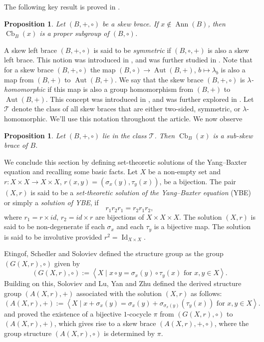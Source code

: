 \documentclass[10pt,a4paper]{amsart}
\numberwithin{equation}{section}
\newtheorem{pro}[equation]{Proposition}
\newcommand{\Cb}{\operatorname{Cb} }
\newcommand{\Id}{\operatorname{Id}}
\newcommand{\gen}[1]{\left < #1 \right >}
\newcommand{\Aut}{\operatorname{Aut} }
\newcommand{\Ann}{\operatorname{Ann} }
\begin{document}
 The following key result is proved in \cite[Theorem 3.3]{CFT25}.

\begin{pro} %
   Let $(B, +, \circ)$ be a skew brace.    If $x \notin \Ann(B)$, then $\Cb_{B}(x)$ is a proper subgroup of  $(B, \circ)$.
\end{pro}



A skew left brace $(B, +, \circ)$ is said to be \emph{symmetric} if $(B, \circ, +)$ is also a skew left brace. This notion was introduced in \cite{LC19}, and was further studied in \cite{BNY23, AC20}. Note that for a skew brace $(B, +, \circ)$ the map $(B, \circ) \to \Aut(B, +)$, $b \mapsto \lambda_b$ is also a map from $(B, +)$ to $\Aut(B, +)$.  We say that the skew brace $(B, +, \circ)$ is \emph{$\lambda$-homomorphic} if this map is also a group homomorphism from $(B, +)$ to $\Aut(B, +)$.  This concept was introduced in \cite{CCD20}, and was further explored in \cite{BNY22}. Let $\mathcal{T}$ denote the class of all skew braces that are either two-sided, symmetric, or $\lambda$-homomorphic.  We'll use this notation throughout the article.  We now observe

\begin{pro}\label{TS-S-L}
    Let $(B, +, \circ)$ lie in the class $\mathcal{T}$.  Then $\Cb_{B}(x)$ is a sub-skew brace of $B$.
\end{pro}


We conclude this section by defining set-theoretic solutions of the Yang--Baxter equation and recalling some basic facts.
Let $X$ be a non-empty set and $r : X \times X \to X \times X$, 
$r(x, y) = (\sigma_x(y), \tau_y(x))$, be a bijection. The pair $(X, r)$ is said to be a {\it set-theoretic solution of the Yang--Baxter equation} (YBE) or simply a {\it solution of YBE}, if
$$
r_1 r_2 r_1 = r_2 r_1 r_2,
$$
where $r_1 = r \times id$, $r_2 = id \times r$ are bijections of $X \times X \times X$. 
The solution $(X,r)$ is said to be non-degenerate if each $\sigma_x$ and each $\tau_y$ is a bijective map. The solution is said to be involutive provided $r^2 = \Id_{X \times X}$.

Etingof, Schedler and Soloviev \cite{ESS99} defined  the structure group as the group $(G(X, r), \circ)$  given by 
$$(G(X,r), \circ) := \gen{X \mid x \circ y = \sigma_x(y) \circ \tau_y(x) \mbox{ for } x, y \in X}.$$
Building on this, Soloviev \cite{S2000} and Lu, Yan and Zhu \cite{LYZ20} defined the derived structure group $(A(X,r),+)$ associated with the solution $(X,r)$ as follows:
$$(A(X,r), +) := \gen{X \mid x + \sigma_x(y) = \sigma_x(y) + \sigma_{\sigma_x(y)}(\tau_y(x)) \mbox{ for } x, y \in X}.$$
and proved the existence of a bijective  $1$-cocycle $\pi$ from $(G(X,r), \circ)$ to $(A(X,r), +)$, which gives rise to a skew brace $(A(X, r), + , \circ)$, where the group structure $(A(X, r), \circ)$ is determined by $\pi$. 
\end{document}
